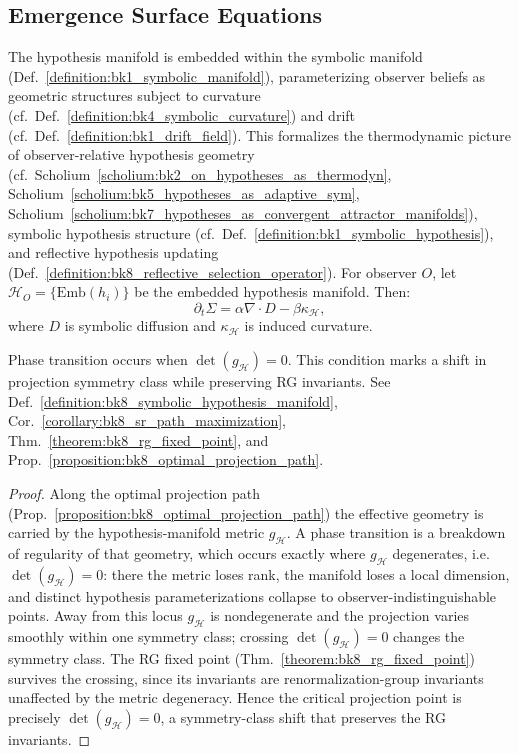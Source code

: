 \subsection{Emergence Surface Equations}
\label{sec:bk8_emergence_surface_equations}
\begin{definition}
\label{definition:bk8_symbolic_hypothesis_manifold}
The hypothesis manifold is embedded within the symbolic manifold (Def.~\ref{definition:bk1_symbolic_manifold}), parameterizing observer beliefs as geometric structures subject to curvature (cf.~Def.~\ref{definition:bk4_symbolic_curvature}) and drift (cf.~Def.~\ref{definition:bk1_drift_field}). This formalizes the thermodynamic picture of observer-relative hypothesis geometry (cf.~Scholium~\ref{scholium:bk2_on_hypotheses_as_thermodyn}, Scholium~\ref{scholium:bk5_hypotheses_as_adaptive_sym}, Scholium~\ref{scholium:bk7_hypotheses_as_convergent_attractor_manifolds}), symbolic hypothesis structure (cf.~Def.~\ref{definition:bk1_symbolic_hypothesis}), and reflective hypothesis updating (Def.~\ref{definition:bk8_reflective_selection_operator}).
For observer \( O \), let \( \mathcal{H}_O = \{ \mathrm{Emb}(h_i) \} \) be the embedded hypothesis manifold. Then:
\[
\partial_t \Sigma = \alpha \nabla \cdot D - \beta \kappa_{\mathcal{H}},
\]
where \( D \) is symbolic diffusion and \( \kappa_{\mathcal{H}} \) is induced curvature.
\end{definition}
\begin{proposition}
\label{proposition:bk8_critical_projection_point}
Phase transition occurs when \( \det(g_{\mathcal{H}}) = 0 \).
This condition marks a shift in projection symmetry class while preserving RG invariants.
See Def.~\ref{definition:bk8_symbolic_hypothesis_manifold}, Cor.~\ref{corollary:bk8_sr_path_maximization}, Thm.~\ref{theorem:bk8_rg_fixed_point}, and Prop.~\ref{proposition:bk8_optimal_projection_path}.
\end{proposition}
\begin{proof}
\label{proof:bk8_critical_projection_point}
\leavevmode
Along the optimal projection path (Prop.~\ref{proposition:bk8_optimal_projection_path}) the effective geometry is carried by the hypothesis-manifold metric $g_{\mathcal{H}}$. A phase transition is a breakdown of regularity of that geometry, which occurs exactly where $g_{\mathcal{H}}$ degenerates, i.e.\ $\det(g_{\mathcal{H}})=0$: there the metric loses rank, the manifold loses a local dimension, and distinct hypothesis parameterizations collapse to observer-indistinguishable points. Away from this locus $g_{\mathcal{H}}$ is nondegenerate and the projection varies smoothly within one symmetry class; crossing $\det(g_{\mathcal{H}})=0$ changes the symmetry class. The RG fixed point (Thm.~\ref{theorem:bk8_rg_fixed_point}) survives the crossing, since its invariants are renormalization-group invariants unaffected by the metric degeneracy. Hence the critical projection point is precisely $\det(g_{\mathcal{H}})=0$, a symmetry-class shift that preserves the RG invariants.
\end{proof}
